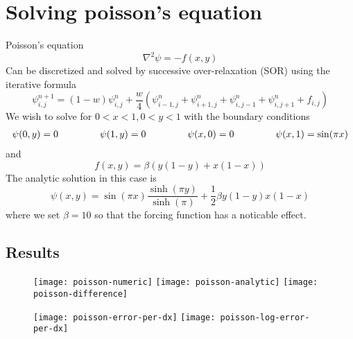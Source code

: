 \documentclass{article}
\begin{document}
\section{Solving poisson's equation}
Poisson's equation 
\begin{equation}
\nabla^2 \psi = - f(x,y)
\end{equation}
Can be discretized and solved by successive over-relaxation (SOR) using the iterative formula
\begin{equation}
\psi^{n+1}_{i,j} = (1-w) \psi^n_{i,j} + \frac{w}{4} \left(\psi^n_{i-1,j}  + \psi^n_{i+1,j}  + \psi^n_{i,j-1}  + \psi^n_{i,j+1} + f_{i,j} \right)
\end{equation}
We wish to solve for $0<x<1, 0<y<1$ with the boundary conditions
\begin{eqnarray}
\psi(0, y) = 0 \hspace{10ex}  \psi(1, y) = 0 \hspace{10ex} \psi(x, 0) = 0 \hspace{10ex} \psi(x, 1) = \sin(\pi x)
\end{eqnarray}
and 
\begin{equation}
f(x, y) = \beta( y(1-y) + x(1-x) )
\end{equation}
The analytic solution in this case is
\begin{equation}
\psi (x,y) = \sin(\pi x) \frac{\sinh(\pi y)}{\sinh(\pi)} + \frac{1}{2} \beta y(1-y)x(1-x)
\end{equation}
where we set $\beta  = 10$ so that the forcing function has a noticable effect.
\newpage
\subsection{Results}
\begin{figure}[h]
    \centering
    \texttt{[image: poisson-numeric]}
    \texttt{[image: poisson-analytic]}
     \texttt{[image: poisson-difference]}
     \caption{}
 \end{figure}
 \begin{figure}[h]
    \centering
    \texttt{[image: poisson-error-per-dx]}
     \texttt{[image: poisson-log-error-per-dx]}
     \caption{}
 \end{figure}
 
\newpage
\end{document}

